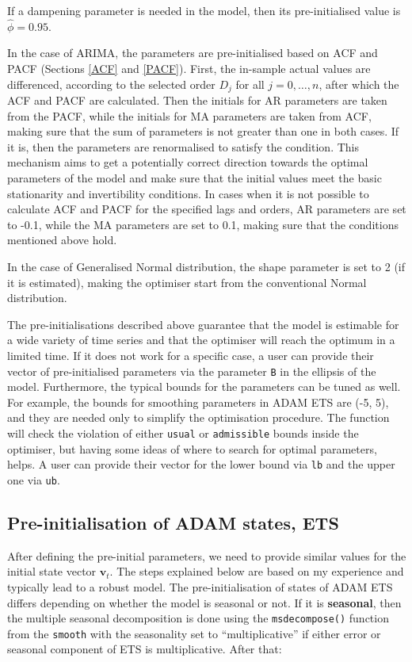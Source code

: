 \documentclass[]{book}
\theoremstyle{definition}
\theoremstyle{definition}
\theoremstyle{definition}
\theoremstyle{definition}
\theoremstyle{remark}
\begin{document}
If a dampening parameter is needed in the model, then its pre-initialised value is \(\hat{\phi}=0.95\).

In the case of ARIMA, the parameters are pre-initialised based on ACF and PACF (Sections \ref{ACF} and \ref{PACF}). First, the in-sample actual values are differenced, according to the selected order \(D_j\) for all \(j=0,\dots,n\), after which the ACF and PACF are calculated. Then the initials for AR parameters are taken from the PACF, while the initials for MA parameters are taken from ACF, making sure that the sum of parameters is not greater than one in both cases. If it is, then the parameters are renormalised to satisfy the condition. This mechanism aims to get a potentially correct direction towards the optimal parameters of the model and make sure that the initial values meet the basic stationarity and invertibility conditions. In cases when it is not possible to calculate ACF and PACF for the specified lags and orders, AR parameters are set to -0.1, while the MA parameters are set to 0.1, making sure that the conditions mentioned above hold.

In the case of Generalised Normal distribution, the shape parameter is set to 2 (if it is estimated), making the optimiser start from the conventional Normal distribution.

The pre-initialisations described above guarantee that the model is estimable for a wide variety of time series and that the optimiser will reach the optimum in a limited time. If it does not work for a specific case, a user can provide their vector of pre-initialised parameters via the parameter \texttt{B} in the ellipsis of the model. Furthermore, the typical bounds for the parameters can be tuned as well. For example, the bounds for smoothing parameters in ADAM ETS are (-5, 5), and they are needed only to simplify the optimisation procedure. The function will check the violation of either \texttt{usual} or \texttt{admissible} bounds inside the optimiser, but having some ideas of where to search for optimal parameters, helps. A user can provide their vector for the lower bound via \texttt{lb} and the upper one via \texttt{ub}.

\hypertarget{pre-initialisation-of-adam-states-ets}{%
\subsection{Pre-initialisation of ADAM states, ETS}\label{pre-initialisation-of-adam-states-ets}}

After defining the pre-initial parameters, we need to provide similar values for the initial state vector \(\mathbf{v}_t\). The steps explained below are based on my experience and typically lead to a robust model. The pre-initialisation of states of ADAM ETS differs depending on whether the model is seasonal or not. If it is \textbf{seasonal}, then the multiple seasonal decomposition is done using the \texttt{msdecompose()} function from the \texttt{smooth} with the seasonality set to ``multiplicative'' if either error or seasonal component of ETS is multiplicative. After that:
\end{document}
